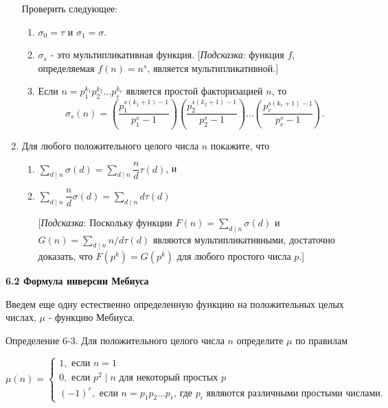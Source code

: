 \documentclass[11pt]{article}
\begin{document}
\begin{enumerate}
        Проверить следующее:
        \begin{enumerate} 
        	\item $\sigma_{0} = \tau$ и $\sigma_{1}=\sigma$.
        	\item $\sigma_{s}$ - это мультипликативная функция. [{\itshape Подсказка}: функция $f$, определяемая $f(n)=n^{s}$, является мультипликативной.]
        	\item Если $n = p_{1}^{k_{1}}p_{2}^{k_{2}}\ldots p_{r}^{k_{r}}$ является простой факторизацией $n$, то $$\sigma_{s}(n)=\left(\frac{p_{1}^{s(k_{1}+1)-1}}{p_{1}^{s}-1}\right)\left(\frac{p_{2}^{s(k_{2}+1)-1}}{p_{2}^{s}-1}\right)\ldots \left(\frac{p_{r}^{s(k_{r}+1)-1}}{p_{r}^{s}-1}\right).$$
        \end{enumerate}
        \item Для любого положительного целого числа $n$ покажите, что
        \begin{enumerate} 
        	\item $\sum \limits_{d\mid n}\sigma(d)=\sum \limits_{d\mid n}\dfrac{n}{d}\tau(d)$, и
        	\setlength{\parskip}{2mm}
        	\item $\sum \limits_{d\mid n}\dfrac{n}{d}\sigma(d)= \sum \limits_{d\mid n}d\tau(d)$
        	
        	[{\itshape Подсказка}: Поскольку функции $F(n)=\sum _{d\mid n}\sigma(d)$ и $G(n)=\sum _{d\mid n}n/d \tau(d) $ являются мультипликативными, достаточно доказать, что $F(p^{k})=G(p^{k})$ для любого простого числа $p$.]\\[5mm]
        \end{enumerate}
\end{enumerate}
 
        \begin{flushleft}
    	\LARGE {\textsf {\textbf {6.2 Формула инверсии Мебиуса}}}
        \end{flushleft}
        Введем еще одну естественно определенную функцию на положительных целых числах, $\mu $ - функцию Мебиуса.
        
        \begin{center}
    	Определение 6-3. Для положительного целого числа $n$ определите $\mu $ по правилам 
        \end{center}
    	\[
    	\mu(n) =
    	\begin{cases}
    	 1,  \text{ если $n=1$} \\
    	 0,  \text{ если $p^{2}\mid n$ для некоторый простых $p$}\\
    	 (-1)^{r},  \text{ если $n=p_{1}p_{2}\ldots p_{r}$, где $p_{i}$ являются различными простыми числами.}
    	\end{cases}
    	\]
    	
\end{document}
